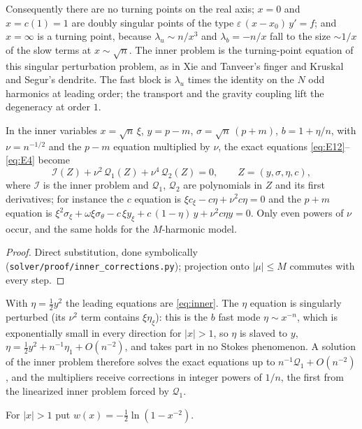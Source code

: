\documentclass{amsart}
\numberwithin{equation}{section}
\theoremstyle{plain}
\newenvironment{lemnamed}[1]{\renewcommand\theinnerlem{#1}\innerlem}{\endinnerlem}
\theoremstyle{definition}
\theoremstyle{remark}
\newcommand{\eps}{\varepsilon}
\newcommand{\repo}[1]{\texttt{#1}}
\begin{document}
Consequently there are no turning points on the real axis; $x = 0$ and $x = c(1) = 1$ are doubly singular points of the
type $\eps\,(x - x_0)\,y' = f$; and $x = \infty$ is a turning point, because $\lambda_u \sim n/x^3$ and $\lambda_b = -n/x$ fall to the
size $\sim 1/x$ of the slow terms at $x \sim \sqrt n$. The inner problem is the turning-point equation of this singular
perturbation problem, as in Xie and Tanveer's finger and Kruskal and Segur's dendrite. The fast block is $\lambda_u$ times the
identity on the $N$ odd harmonics at leading order; the transport and the gravity coupling lift the degeneracy at order $1$.

\begin{lemnamed}{B5.0}\label{lem:B50}
In the inner variables $x = \sqrt n\,\xi$, $y = p - m$, $\sigma = \sqrt n\,(p+m)$, $b = 1 + \eta/n$, with $\nu = n^{-1/2}$ and
the $p - m$ equation multiplied by $\nu$, the exact equations \eqref{eq:E12}--\eqref{eq:E4} become
\[
\mathcal I(Z) + \nu^2\,\mathcal Q_1(Z) + \nu^4\,\mathcal Q_2(Z) = 0, \qquad Z = (y, \sigma, \eta, c),
\]
where $\mathcal I$ is the inner problem and $\mathcal Q_1$, $\mathcal Q_2$ are polynomials in $Z$ and its first derivatives; for
instance the $c$ equation is $\xi c_\xi - c\eta + \nu^2c\eta = 0$ and the $p + m$ equation is
$\xi^2\sigma_\xi + \omega\xi\sigma_\theta - c\,\xi y_\xi + c\,(1 - \eta)\,y + \nu^2c\eta y = 0$. Only even powers of $\nu$ occur, and the same
holds for the $M$-harmonic model.
\end{lemnamed}

\begin{proof}
Direct substitution, done symbolically (\repo{solver/proof/inner\_corrections.py}); projection onto $|\mu| \le M$ commutes
with every step.
\end{proof}

With $\eta = \tfrac12 y^2$ the leading equations are \eqref{eq:inner}. The $\eta$ equation is singularly perturbed (its
$\nu^2$ term contains $\xi\eta_\xi$): this is the $b$ fast mode $\eta \sim x^{-n}$, which is exponentially small in every
direction for $|x| > 1$, so $\eta$ is slaved to $y$, $\eta = \tfrac12 y^2 + n^{-1}\eta_1 + O(n^{-2})$, and takes part in no
Stokes phenomenon. A solution of the inner problem therefore solves the exact equations up to $n^{-1}\mathcal Q_1 + O(n^{-2})$,
and the multipliers receive corrections in integer powers of $1/n$, the first from the linearized inner problem forced
by $\mathcal Q_1$.

For $|x| > 1$ put $w(x) = -\tfrac12\ln(1 - x^{-2})$.
\end{document}
